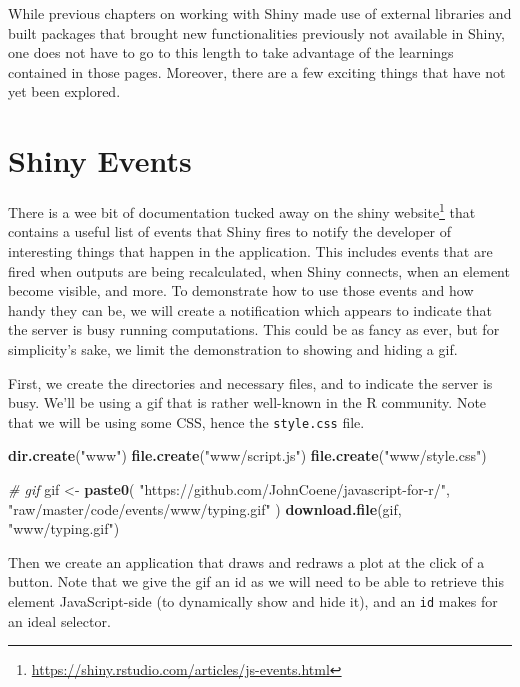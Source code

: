 \documentclass[10pt,]{krantz}
\makeatletter
\newenvironment{Shaded}{\begin{snugshade}}{\end{snugshade}}
\newcommand{\CommentTok}[1]{\textcolor[rgb]{0.37,0.37,0.37}{\textit{#1}}}
\newcommand{\KeywordTok}[1]{\textcolor[rgb]{0.27,0.27,0.27}{\textbf{#1}}}
\newcommand{\NormalTok}[1]{#1}
\newcommand{\StringTok}[1]{\textcolor[rgb]{0.5,0.5,0.5}{#1}}
\renewcommand{\href}[2]{#2\footnote{\url{#1}}}
\newenvironment{kframe}{%
\medskip{}
\setlength{\fboxsep}{.8em}
 \def\at@end@of@kframe{}%
 \ifinner\ifhmode%
  \def\at@end@of@kframe{\end{minipage}}%
  \begin{minipage}{\columnwidth}%
 \fi\fi%
 \def\FrameCommand##1{\hskip\@totalleftmargin \hskip-\fboxsep
 \colorbox{shadecolor}{##1}\hskip-\fboxsep
     \hskip-\linewidth \hskip-\@totalleftmargin \hskip\columnwidth}%
 \MakeFramed {\advance\hsize-\width
   \@totalleftmargin\z@ \linewidth\hsize
   \@setminipage}}%
 {\par\unskip\endMakeFramed%
 \at@end@of@kframe}
\renewenvironment{Shaded}{\begin{kframe}}{\end{kframe}}
\makeatother
\begin{document}
While previous chapters on working with Shiny made use of external libraries and built packages that brought new functionalities previously not available in Shiny, one does not have to go to this length to take advantage of the learnings contained in those pages. Moreover, there are a few exciting things that have not yet been explored.

\hypertarget{shiny-tips-events}{%
\section{Shiny Events}\label{shiny-tips-events}}

There is a wee bit of documentation tucked away on the \href{https://shiny.rstudio.com/articles/js-events.html}{shiny website} that contains a useful list of events that Shiny fires to notify the developer of interesting things that happen in the application. This includes events that are fired when outputs are being recalculated, when Shiny connects, when an element become visible, and more. To demonstrate how to use those events and how handy they can be, we will create a notification which appears to indicate that the server is busy running computations. This could be as fancy as ever, but for simplicity's sake, we limit the demonstration to showing and hiding a gif.

First, we create the directories and necessary files, and to indicate the server is busy. We'll be using a gif that is rather well-known in the R community. Note that we will be using some CSS, hence the \texttt{style.css} file.

\begin{Shaded}
\begin{Highlighting}[]
\KeywordTok{dir.create}\NormalTok{(}\StringTok{"www"}\NormalTok{)}
\KeywordTok{file.create}\NormalTok{(}\StringTok{"www/script.js"}\NormalTok{)}
\KeywordTok{file.create}\NormalTok{(}\StringTok{"www/style.css"}\NormalTok{)}

\CommentTok{# gif}
\NormalTok{gif <-}\StringTok{ }\KeywordTok{paste0}\NormalTok{(}
  \StringTok{"https://github.com/JohnCoene/javascript-for-r/"}\NormalTok{,}
  \StringTok{"raw/master/code/events/www/typing.gif"}
\NormalTok{)}
\KeywordTok{download.file}\NormalTok{(gif, }\StringTok{"www/typing.gif"}\NormalTok{)}
\end{Highlighting}
\end{Shaded}

Then we create an application that draws and redraws a plot at the click of a button. Note that we give the gif an id as we will need to be able to retrieve this element JavaScript-side (to dynamically show and hide it), and an \texttt{id} makes for an ideal selector.
\end{document}
